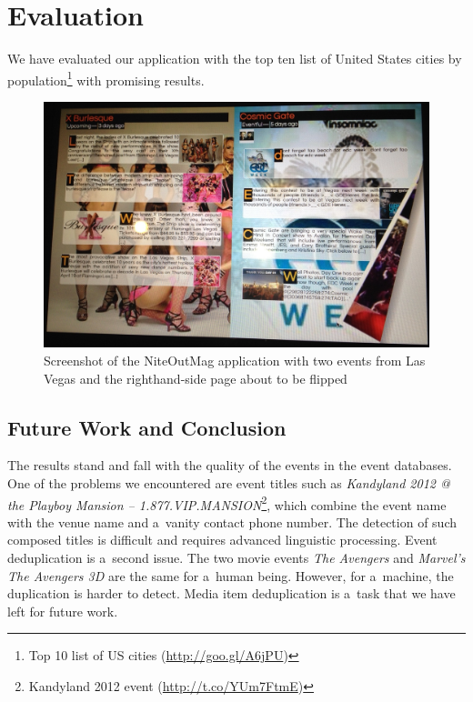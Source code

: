 \documentclass[runningheads,a4paper]{llncs}
\begin{document}
{%

\section{Evaluation}                                                       \label{sec:experiments}
We have evaluated our application with the top ten list of United States cities by population\footnote{Top 10 list of US cities (\url{http://goo.gl/A6jPU})} with promising results.

\begin{figure}[b!]
\centering
\includegraphics[width=1.0\columnwidth]{./screenshot.jpg}
\caption{Screenshot of the NiteOutMag application with two events from Las Vegas and the righthand-side page about to be flipped}
\label{fig:screenshot}
\end{figure}

\subsection{Future Work and Conclusion}
The results stand and fall with the quality of the events in the event databases. One of the problems we encountered are event titles such as
\emph{Kandyland 2012 @ the Playboy Mansion -- 1.877.VIP.MANSION}\footnote{Kandyland 2012 event (\url{http://t.co/YUm7FtmE})}, which combine the event name with the venue name
and a~vanity contact phone number. The detection of such composed titles is difficult and requires advanced linguistic processing.
Event deduplication is a~second issue. The two movie events \emph{The Avengers} and \emph{Marvel's The Avengers 3D} are the same for a~human being. However, for a~machine, the duplication is harder to detect. Media item deduplication is a~task that we have left for future work.

}
\end{document}
